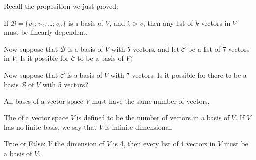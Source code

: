 

Recall the proposition we just proved: 

{}  If $\mathcal{B}  = \{v_1; v_2; \ldots ; v_n\}$ is a basis of $V$, and $k>v$, then any list
of $k$ vectors in $V$ must be linearly dependent.  

Now suppose that $\mathcal{B}$ is a basis of $V$ with 5 vectors, and let $\mathcal{C}$ be a list of 7 vectors
in $V$.  Is it possible for $\mathcal{C}$ to be a basis of $V$?  



\edXsolution{
}

\endedxproblem



Now suppose that  $\mathcal{C}$ is a basis of $V$ with 7 vectors.  Is it possible for there to be a basis $\mathcal{B}$ of $V$ with 5 vectors?  



\edXsolution{
}

\endedxproblem

\endedxvertical









{}  All bases of a vector space $V$ must have the same number of vectors.  
  

{}  
The {} of a vector space $V$ is defined to be the number of vectors in 
a basis of $V$.  If $V$ has no finite basis, we say that $V$ is infinite-dimensional.  


\endedxtext



True or False: If the dimension of $V$ is 4, then every list of 4 vectors in $V$ must be a basis of $V$.  


\edXsolution{
}

\endedxproblem




